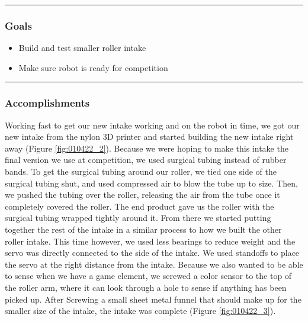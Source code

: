 	
\noindent\hfil\rule{\textwidth}{.4pt}\hfil
\subsubsection*{Goals}
\begin{itemize}
    \item Build and test smaller roller intake
	\item Make sure robot is ready for competition


\end{itemize} 

\noindent\hfil\rule{\textwidth}{.4pt}\hfil

\subsubsection*{Accomplishments}
Working fast to get our new intake working and on the robot in time, we got our new intake from the nylon 3D printer and started building the new intake right away (Figure \ref{fig:010422_2}). Because we were hoping to make this intake the final version we use at competition, we used  surgical tubing instead of rubber bands. To get the surgical tubing around our roller, we tied one side of the surgical tubing shut, and used compressed air to blow the tube up to size. Then, we pushed the tubing over the roller, releasing the air from the tube once it completely covered the roller. The end product gave us the roller with the surgical tubing wrapped tightly around it. From there we started putting together the rest of the intake in a similar process to how we built the other roller intake. This time however, we used less bearings to reduce weight and the servo was directly connected to the side of the intake. We used standoffs to place the servo at the right distance from the intake. Because we also wanted to be able to sense when we have a game element, we screwed a color sensor to the top of the roller arm, where it can look through a hole to sense if anything has been picked up. After Screwing a small sheet metal funnel that should make up for the smaller size of the intake, the intake was complete (Figure \ref{fig:010422_3}). 
